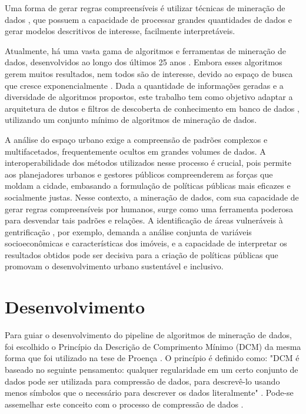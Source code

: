 \documentclass[12pt]{article}
\begin{document}
Uma forma de gerar regras compreensíveis é utilizar técnicas de mineração de dados \cite{zaki2014data}, que possuem a capacidade de processar grandes quantidades de dados e gerar modelos descritivos de interesse, facilmente interpretáveis. 

Atualmente, há uma vasta gama de algoritmos e ferramentas \cite{mikut2011data} de mineração de dados, desenvolvidos ao longo dos últimos 25 anos \cite{luna2019frequent}. Embora esses algoritmos gerem muitos resultados, nem todos são de interesse, devido ao espaço de busca que cresce exponencialmente \cite{zaki2014data}. Dada a quantidade de informações geradas e a diversidade de algoritmos propostos, este trabalho tem como objetivo adaptar a arquitetura de dutos e filtros de descoberta de conhecimento em banco de dados \cite{nwagu2017knowledge}, utilizando um conjunto mínimo de algoritmos de mineração de dados.

A análise do espaço urbano exige a compreensão de padrões complexos e multifacetados, frequentemente ocultos em grandes volumes de dados. A interoperabilidade dos métodos utilizados nesse processo é crucial, pois permite aos planejadores urbanos e gestores públicos compreenderem as forças que moldam a cidade, embasando a formulação de políticas públicas mais eficazes e socialmente justas. Nesse contexto, a mineração de dados, com sua capacidade de gerar regras compreensíveis por humanos, surge como uma ferramenta poderosa para desvendar tais padrões e relações. A identificação de áreas vulneráveis à gentrificação \cite{andrade2020urban}, por exemplo, demanda a análise conjunta de variáveis socioeconômicas e características dos imóveis, e a capacidade de interpretar os resultados obtidos pode ser decisiva para a criação de políticas públicas que promovam o desenvolvimento urbano sustentável e inclusivo.

\section{Desenvolvimento}

Para guiar o desenvolvimento do pipeline de algoritmos de mineração de dados, foi escolhido o Princípio da Descrição de Comprimento Mínimo (DCM) da mesma forma que foi utilizado na tese de Proença \cite{proencca2021robust}.  O princípio é definido como: "DCM é baseado no seguinte pensamento: qualquer regularidade em um certo conjunto de dados pode ser utilizada para compressão de dados, para descrevê-lo usando menos símbolos que o necessário para descrever os dados literalmente" \cite{grunwald2007minimum}. Pode-se assemelhar este conceito com o processo de compressão de dados  \cite{proencca2021robust}.
\end{document}
